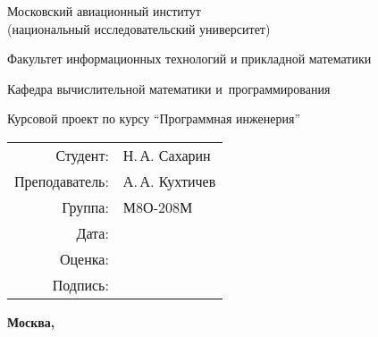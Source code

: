 \begin{titlepage}
\begin{center}
\bfseries

{\Large Московский авиационный институт\\ (национальный исследовательский университет)}

\vspace{48pt}

{\large Факультет информационных технологий и прикладной математики}

\vspace{36pt}

{\large Кафедра вычислительной математики и~программирования}


\vspace{48pt}

Курсовой проект по курсу \enquote{Программная инженерия}

\end{center}

\vspace{72pt}

\begin{flushright}
\begin{tabular}{rl}
Студент: & Н.\,А. Сахарин \\
Преподаватель: & А.\,А. Кухтичев \\
Группа: & М8О-208М \\
Дата: & \\
Оценка: & \\
Подпись: & \\
\end{tabular}
\end{flushright}

\vfill

\begin{center}
\bfseries
Москва, \the\year
\end{center}
\end{titlepage}

\pagebreak
